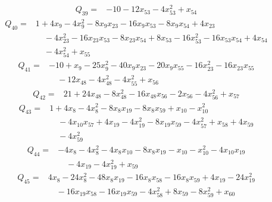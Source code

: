 \begin{equation*}\begin{split}
Q_{39}={}&-10 - 12x_{53} - 4x_{53}^{2} + x_{54}
\end{split}\end{equation*}
\begin{equation*}\begin{split}
Q_{40}={}&1 + 4x_{9} - 4x_{9}^{2} - 8x_{9} x_{23} - 16x_{9} x_{53} - 8x_{9} x_{54} + 4x_{23}\\
&\quad -4x_{23}^{2} - 16x_{23} x_{53} - 8x_{23} x_{54} + 8x_{53} - 16x_{53}^{2} - 16x_{53} x_{54} + 4x_{54}\\
&\quad -4x_{54}^{2} + x_{55}
\end{split}\end{equation*}
\begin{equation*}\begin{split}
Q_{41}={}&-10 + x_{9} - 25x_{9}^{2} - 40x_{9} x_{23} - 20x_{9} x_{55} - 16x_{23}^{2} - 16x_{23} x_{55}\\
&\quad -12x_{48} - 4x_{48}^{2} - 4x_{55}^{2} + x_{56}
\end{split}\end{equation*}
\begin{equation*}\begin{split}
Q_{42}={}&21 + 24x_{48} - 8x_{48}^{2} - 16x_{48} x_{56} - 2x_{56} - 4x_{56}^{2} + x_{57}
\end{split}\end{equation*}
\begin{equation*}\begin{split}
Q_{43}={}&1 + 4x_{8} - 4x_{8}^{2} - 8x_{8} x_{19} - 8x_{8} x_{59} + x_{10} - x_{10}^{2}\\
&\quad -4x_{10} x_{57} + 4x_{19} - 4x_{19}^{2} - 8x_{19} x_{59} - 4x_{57}^{2} + x_{58} + 4x_{59}\\
&\quad -4x_{59}^{2}
\end{split}\end{equation*}
\begin{equation*}\begin{split}
Q_{44}={}&-4x_{8} - 4x_{8}^{2} - 4x_{8} x_{10} - 8x_{8} x_{19} - x_{10} - x_{10}^{2} - 4x_{10} x_{19}\\
&\quad -4x_{19} - 4x_{19}^{2} + x_{59}
\end{split}\end{equation*}
\begin{equation*}\begin{split}
Q_{45}={}&4x_{8} - 24x_{8}^{2} - 48x_{8} x_{19} - 16x_{8} x_{58} - 16x_{8} x_{59} + 4x_{19} - 24x_{19}^{2}\\
&\quad -16x_{19} x_{58} - 16x_{19} x_{59} - 4x_{58}^{2} + 8x_{59} - 8x_{59}^{2} + x_{60}
\end{split}\end{equation*}
